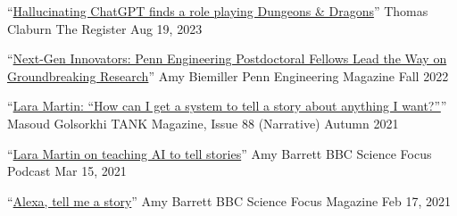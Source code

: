 
{\color{black}\fontsize{12pt}{1em}} 







  \cvmedia
    {``\href{https://www.theregister.com/2023/08/19/chatgpt_dnd_dm/}{Hallucinating ChatGPT finds a role playing Dungeons \& Dragons}''} %
    {Thomas Claburn} %
    {The Register} %
    {Aug 19, 2023} %

  \cvmedia
    {``\href{https://magazine.seas.upenn.edu/fall-2022/next-gen-innovators/}{Next-Gen Innovators: Penn Engineering Postdoctoral Fellows Lead the Way on Groundbreaking Research}''} %
    {Amy Biemiller} %
    {Penn Engineering Magazine} %
    {Fall 2022} %

  \cvmedia
    {``\href{https://magazine.tank.tv/issue-88/talk/lara-martin}{Lara Martin: ``How can I get a system to tell a story about anything I want?''}''} %
    {Masoud Golsorkhi} %
    {TANK Magazine, Issue 88 (Narrative)} %
    {Autumn 2021} %

  \cvmedia
    {``\href{https://www.sciencefocus.com/future-technology/lara-martin-on-teaching-ai-to-tell-stories/}{Lara Martin on teaching AI to tell stories}''} %
    {Amy Barrett} %
    {BBC Science Focus Podcast} %
    {Mar 15, 2021} %

  \cvmedia
    {``\href{https://www.sciencefocus.com/magazine/dark-stars/}{Alexa, tell me a story}''} %
    {Amy Barrett} %
    {BBC Science Focus Magazine} %
    {Feb 17, 2021} %

